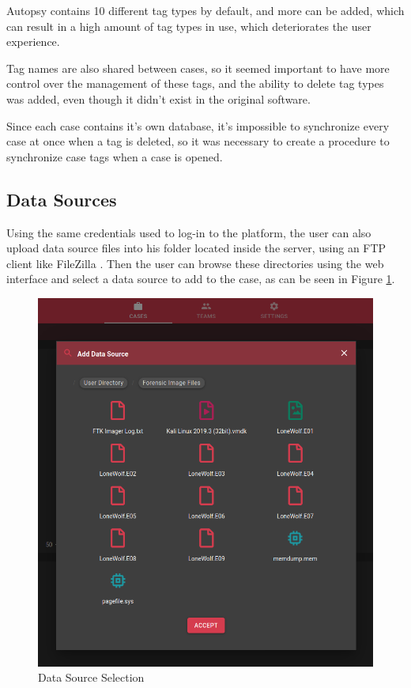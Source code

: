 Autopsy contains 10 different tag types by default, and more can be added, which can result in a high amount of tag types in use, which deteriorates the user experience.

Tag names are also shared between cases, so it seemed important to have more control over the management of these tags, and the ability to delete tag types was added, even though it didn't exist in the original software.

Since each case contains it's own database, it's impossible to synchronize every case at once when a tag is deleted, so it was necessary to create a procedure to synchronize case tags when a case is opened.

\subsection{Data Sources}

Using the same credentials used to log-in to the platform, the user can also upload data source files into his folder located inside the server, using an FTP client like FileZilla \cite{filezilla}.
Then the user can browse these directories using the web interface and select a data source to add to the case, as can be seen in Figure \ref{fig:datasource}.

\begin{figure}[ht]
 \centering
 \includegraphics[width=0.75\linewidth]{imgs/data-sources.png}
 \caption{Data Source Selection}
 \label{fig:datasource}
\end{figure}

